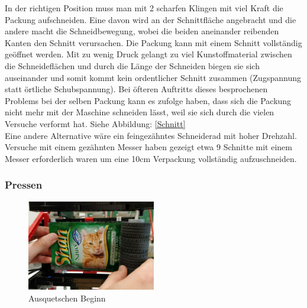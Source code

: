 In der richtigen Position muss man mit 2 scharfen Klingen mit viel Kraft die Packung aufschneiden. Eine davon wird an der Schnittfläche angebracht und die andere macht die Schneidbewegung, wobei die beiden aneinander reibenden Kanten den Schnitt verursachen. Die Packung kann mit einem Schnitt vollständig geöffnet werden. Mit zu wenig Druck gelangt zu viel Kunstoffmaterial zwischen die Schneideflächen und durch die Länge der Schneiden biegen sie sich auseinander und somit kommt kein ordentlicher Schnitt zusammen (Zugspannung statt örtliche Schubspannung). Bei öfteren Auftritts dieses besprochenen Problems bei der selben Packung kann es zufolge haben, dass sich die Packung nicht mehr mit der Maschine schneiden lässt, weil sie sich durch die vielen Versuche verformt hat. Siehe Abbildung: \ref{Schnitt} \\

Eine andere Alternative wäre ein feingezähntes Schneiderad mit hoher Drehzahl. Versuche mit einem gezähnten Messer haben gezeigt etwa 9 Schnitte mit einem Messer erforderlich waren um eine 10cm Verpackung vollständig aufzuschneiden.


\subsubsection{Pressen}

\begin{figure}
\vspace{-30pt}
  \begin{center}
    \includegraphics[width=0.50\textwidth]{Bilder/Ablauf_1_png/Ausquetschen_1}
  \end{center}
  \caption{Ausquetschen Beginn}
  \label{Ausquetschen Beginn}
  \vspace{-10pt}
\end{figure}

